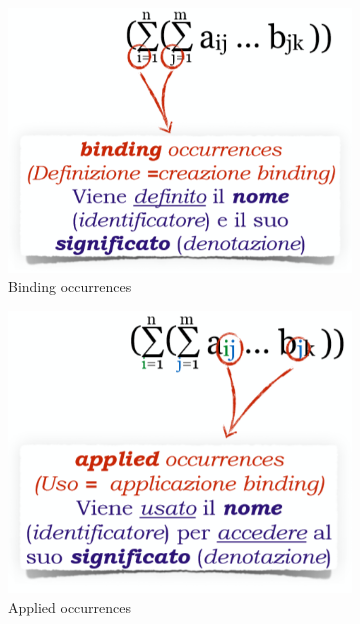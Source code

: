 \documentclass[a4paper,oneside,titlepage]{book}
\begin{document}
\begin{figure}[htp]
	\begin{subfigure}{0.49\textwidth}
		\includegraphics[width=\textwidth, height=\textheight, keepaspectratio]{bocc.png} 
		\caption{Binding occurrences}
	\end{subfigure}
	\begin{subfigure}{0.49\textwidth}
		\includegraphics[width=\textwidth, height=\textheight, keepaspectratio]{aocc.png}
		\caption{Applied occurrences}
	\end{subfigure}
	\begin{subfigure}{0.49\textwidth}

\end{subfigure}
\end{figure}
\end{document}
